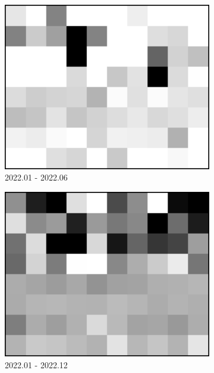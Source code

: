 \documentclass[a4paper,fleqn]{cas-sc}
\begin{document}
\begin{figure}
\begin{subfigure}{0.3\textwidth}
        \centering
        \includegraphics[width=\textwidth]{figure/The azimuth shift/shift_Milan_des_20220630.png}
        \caption{2022.01 - 2022.06}
        \label{fig_7d}
    \end{subfigure}
    \begin{subfigure}{0.3\textwidth}
        \centering
        \includegraphics[width=\textwidth]{figure/The azimuth shift/shift_Milan_des_20221227.png}
        \caption{2022.01 - 2022.12}
        \label{fig_7e}
    \end{subfigure}
    \begin{subfigure}{0.3\textwidth}

\end{subfigure}
\end{figure}
\end{document}
